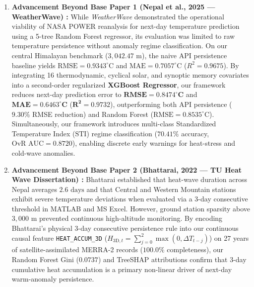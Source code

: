 \documentclass[conference]{IEEEtran}
\begin{document}
\begin{enumerate}
    \item \textbf{Advancement Beyond Base Paper 1 (Nepal et al., 2025 --- WeatherWave) \cite{nepal2025}:} While \textit{WeatherWave} demonstrated the operational viability of NASA POWER reanalysis for next-day temperature prediction using a 5-tree Random Forest regressor, its evaluation was limited to raw temperature persistence without anomaly regime classification. On our central Himalayan benchmark ($3,042.47\text{ m}$), the naive API persistence baseline yields $\text{RMSE} = 0.9343^\circ\text{C}$ and $\text{MAE} = 0.7057^\circ\text{C}$ ($R^2 = 0.9675$). By integrating 16 thermodynamic, cyclical solar, and synoptic memory covariates into a second-order regularized \textbf{XGBoost Regressor}, our framework reduces next-day prediction error to $\mathbf{\text{RMSE} = 0.8474^\circ\text{C}}$ and $\mathbf{\text{MAE} = 0.6463^\circ\text{C}}$ ($\mathbf{R^2 = 0.9732}$), outperforming both API persistence ($9.30\%$ RMSE reduction) and Random Forest ($\text{RMSE} = 0.8535^\circ\text{C}$). Simultaneously, our framework introduces multi-class Standardized Temperature Index ($\text{STI}$) regime classification ($70.41\%$ accuracy, $\text{OvR AUC} = 0.8720$), enabling discrete early warnings for heat-stress and cold-wave anomalies.
    
    \item \textbf{Advancement Beyond Base Paper 2 (Bhattarai, 2022 --- TU Heat Wave Dissertation) \cite{bhattarai2022}:} Bhattarai established that heat-wave duration across Nepal averages $2.6\text{ days}$ and that Central and Western Mountain stations exhibit severe temperature deviations when evaluated via a 3-day consecutive threshold in MATLAB and MS Excel. However, ground station sparsity above $3,000\text{ m}$ prevented continuous high-altitude monitoring. By encoding Bhattarai's physical 3-day consecutive persistence rule into our continuous causal feature \texttt{HEAT\_ACCUM\_3D} ($H_{3\text{D}, t} = \sum_{j=0}^{2}\max(0, \Delta T_{t-j})$) on 27 years of satellite-assimilated MERRA-2 records ($100.0\%$ completeness), our Random Forest Gini ($0.0737$) and TreeSHAP attributions confirm that 3-day cumulative heat accumulation is a primary non-linear driver of next-day warm-anomaly persistence.
    

\end{enumerate}
\end{document}
